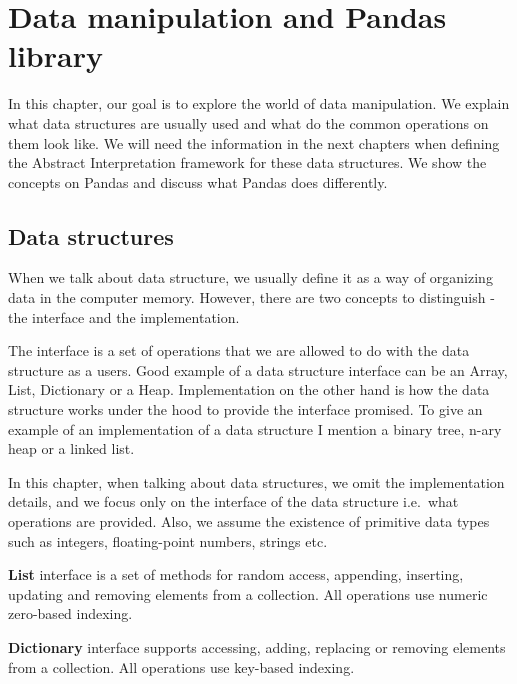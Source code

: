 \chapter{Data manipulation and Pandas library}

In this chapter, our goal is to explore the world of data manipulation.
We explain what data structures are usually used and what do the common operations on them look like.
We will need the information in the next chapters when defining the Abstract Interpretation framework for these data
structures.
We show the concepts on Pandas and discuss what Pandas does differently.

\section{Data structures} %

When we talk about data structure, we usually define it as a way of organizing data in the computer memory.
However, there are two concepts to distinguish - the interface and the implementation.

The interface is a set of operations that we are allowed to do with the data structure as a users.
Good example of a data structure interface can be an Array, List, Dictionary or a Heap.
Implementation on the other hand is how the data structure works under the hood to provide the interface promised.
To give an example of an implementation of a data structure I mention a binary tree, n-ary heap or a linked list.

In this chapter, when talking about data structures, we omit the implementation details, and we focus only on the
interface of the data structure i.e.\ what operations are provided.
Also, we assume the existence of primitive data types such as integers, floating-point numbers, strings etc.

\begin{defn}
    \textbf{List} interface is a set of methods for random access, appending, inserting, updating and removing elements
    from a collection.
    All operations use numeric zero-based indexing.
\end{defn}

\begin{defn}
    \textbf{Dictionary} interface supports accessing, adding, replacing or removing elements from a collection.
    All operations use key-based indexing.
\end{defn}

